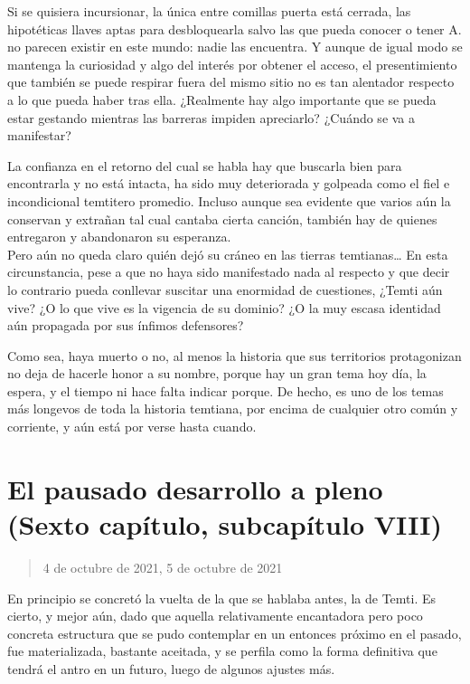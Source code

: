 \documentclass[
  spanish,
]{book}
\begin{document}
Si se quisiera incursionar, la única entre comillas puerta está cerrada, las hipotéticas llaves aptas para desbloquearla salvo las que pueda conocer o tener A. no parecen existir en este mundo: nadie las encuentra. Y aunque de igual modo se mantenga la curiosidad y algo del interés por obtener el acceso, el presentimiento que también se puede respirar fuera del mismo sitio no es tan alentador respecto a lo que pueda haber tras ella. ¿Realmente hay algo importante que se pueda estar gestando mientras las barreras impiden apreciarlo? ¿Cuándo se va a manifestar?

La confianza en el retorno del cual se habla hay que buscarla bien para encontrarla y no está intacta, ha sido muy deteriorada y golpeada como el fiel e incondicional temtitero promedio. Incluso aunque sea evidente que varios aún la conservan y extrañan tal cual cantaba cierta canción, también hay de quienes entregaron y abandonaron su esperanza.\\
Pero aún no queda claro quién dejó su cráneo en las tierras temtianas\ldots{} En esta circunstancia, pese a que no haya sido manifestado nada al respecto y que decir lo contrario pueda conllevar suscitar una enormidad de cuestiones, ¿Temti aún vive? ¿O lo que vive es la vigencia de su dominio? ¿O la muy escasa identidad aún propagada por sus ínfimos defensores?

Como sea, haya muerto o no, al menos la historia que sus territorios protagonizan no deja de hacerle honor a su nombre, porque hay un gran tema hoy día, la espera, y el tiempo ni hace falta indicar porque. De hecho, es uno de los temas más longevos de toda la historia temtiana, por encima de cualquier otro común y corriente, y aún está por verse hasta cuando.

\hypertarget{el-pausado-desarrollo-a-pleno-sexto-capuxedtulo-subcapuxedtulo-viii}{%
\section{El pausado desarrollo a pleno (Sexto capítulo, subcapítulo VIII)}\label{el-pausado-desarrollo-a-pleno-sexto-capuxedtulo-subcapuxedtulo-viii}}

\begin{quote}
4 de octubre de 2021, 5 de octubre de 2021
\end{quote}

En principio se concretó la vuelta de la que se hablaba antes, la de Temti. Es cierto, y mejor aún, dado que aquella relativamente encantadora pero poco concreta estructura que se pudo contemplar en un entonces próximo en el pasado, fue materializada, bastante aceitada, y se perfila como la forma definitiva que tendrá el antro en un futuro, luego de algunos ajustes más.
\end{document}
